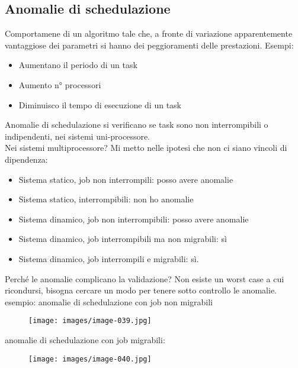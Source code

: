 \documentclass[12pt, oneside]{extbook}
\begin{document}
\subsection{Anomalie di schedulazione}
Comportamene di un algoritmo tale che, a fronte di variazione apparentemente vantaggiose dei parametri si hanno dei peggioramenti delle prestazioni. Esempi:
\begin{itemize}
\item Aumentano il periodo di un task
\item Aumento n° processori
\item Diminuisco il tempo di esecuzione di un task
\end{itemize}
Anomalie di schedulazione si verificano se task sono non interrompibili o indipendenti, nei sistemi uni-processore.\\ Nei sistemi multiprocessore? Mi metto nelle ipotesi che non ci siano vincoli di dipendenza:\\
\begin{itemize}
\item Sistema statico, job non interrompili: posso avere anomalie
\item Sistema statico, interrompibili: non ho anomalie
\item Sistema dinamico, job non interrompibili: posso avere anomalie
\item Sistema dinamico, job interrompibili ma non migrabili: sì
\item Sistema dinamico, job interrompili e migrabili: sì.
\end{itemize}
Perché le anomalie complicano la validazione? Non esiste un worst case a cui ricondursi, bisogna cercare un modo per tenere sotto controllo le anomalie.\\ esempio: anomalie di schedulazione con job non migrabili\\
\begin{figure}[!h]
\centering
\texttt{[image: images/image-039.jpg]}
\end{figure}
anomalie di schedulazione con job migrabili:\\
\begin{figure}[!h]
\centering
\texttt{[image: images/image-040.jpg]}
\end{figure}
\end{document}
